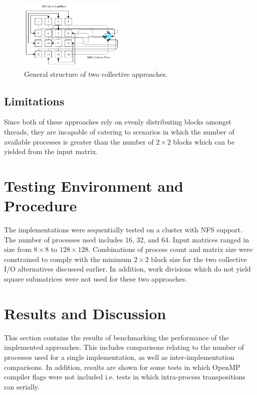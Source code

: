 \documentclass[journal,10pt,a4paper]{IEEEtran}
\begin{document}
\begin{figure}[H]
    \centering
    \includegraphics[width=0.45\textwidth]{col.pdf}
    \caption{General structure of two collective approaches.}
    \label{fig:my_label}
\end{figure}



\subsection{Limitations}
Since both of these approaches rely on evenly distributing blocks amongst threads, they are incapable of catering to scenarios in which the number of available processes is greater than the number of $2\times 2$ blocks which can be yielded from the input matrix.








\section{Testing Environment and Procedure}

The implementations were sequentially tested on a cluster with NFS support. The number of processes used includes 16, 32, and 64. Input matrices ranged in size from $8\times 8$ to $128\times 128$. Combinations of process count and matrix size were constrained to comply with the minimum $2\times 2$ block size for the two collective I/O alternatives discussed earlier. In addition, work divisions which do not yield square submatrices were not used for these two approaches.


\section{Results and Discussion}

This section contains the results of benchmarking the performance of the implemented approaches. This includes comparisons relating to the number of processes used for a single implementation, as well as inter-implementation comparisons. In addition, results are shown for some tests in which OpenMP compiler flags were not included i.e. tests in which intra-process transpositions ran serially.
\end{document}
